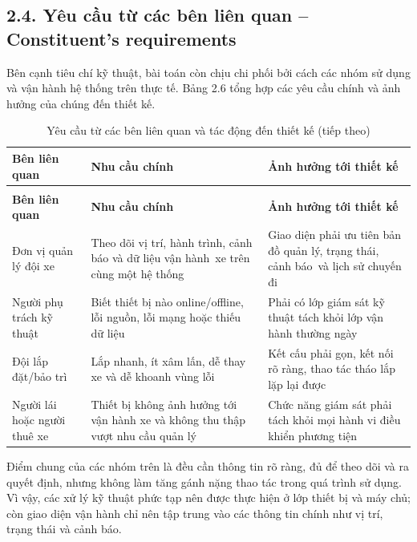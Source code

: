 \documentclass[a4paper]{extarticle}
\newcommand{\thesissettableid}[2]{%
  \renewcommand{\thetable}{#1}%
  \renewcommand{\theHtable}{#2}%
}
\begin{document}
\subsection{2.4. Yêu cầu từ các bên liên quan -- Constituent's requirements}\label{yuxeau-cux1ea7u-tux1eeb-cuxe1c-buxean-liuxean-quan-constituents-requirements}

Bên cạnh tiêu chí kỹ thuật, bài toán còn chịu chi phối bởi cách các nhóm sử dụng và vận hành hệ thống trên thực tế. Bảng 2.6 tổng hợp các yêu cầu chính và ảnh hưởng của chúng đến thiết kế.

{\thesissettableid{2.6}{condensed-r2-bang-2-6-yeu-cau-tu-cac-ben-lien-quan-va-tac-dong-den-thiet-ke}
\def\LTcaptype{table}
\begin{longtable}{|L{(\linewidth - 4\tabcolsep) * }|L{(\linewidth - 4\tabcolsep) * }|L{(\linewidth - 4\tabcolsep) * }|}
\caption{Yêu cầu từ các bên liên quan và tác động đến thiết kế}\label{tab:condensed-r2-bang-2-6-yeu-cau-tu-cac-ben-lien-quan-va-tac-dong-den-thiet-ke}\\
\hline
\textbf{Bên liên quan} & \textbf{Nhu cầu chính} & \textbf{Ảnh hưởng tới thiết kế} \\
\hline
\endfirsthead
\caption[]{Yêu cầu từ các bên liên quan và tác động đến thiết kế (tiếp theo)}\\
\hline
\textbf{Bên liên quan} & \textbf{Nhu cầu chính} & \textbf{Ảnh hưởng tới thiết kế} \\
\hline
\endhead
\endfoot
\endlastfoot
Đơn vị quản lý đội xe & Theo dõi vị trí, hành trình, cảnh báo và dữ liệu vận hành~xe trên cùng một hệ thống & Giao diện phải ưu tiên bản đồ quản lý, trạng thái, cảnh báo~và lịch sử chuyến đi \\\hline
Người phụ trách kỹ thuật & Biết thiết bị nào online/offline, lỗi nguồn, lỗi mạng hoặc thiếu dữ liệu & Phải có lớp giám sát kỹ thuật tách khỏi lớp vận hành thường ngày \\\hline
Đội lắp đặt/bảo trì & Lắp nhanh, ít xâm lấn, dễ thay xe và dễ khoanh vùng lỗi & Kết cấu phải gọn, kết nối rõ ràng, thao tác tháo lắp lặp lại được \\\hline
Người lái hoặc người thuê xe & Thiết bị không ảnh hưởng tới vận hành xe và không thu thập vượt nhu cầu quản lý & Chức năng giám sát phải tách khỏi mọi hành vi điều khiển phương tiện \\\hline
\end{longtable}
}
Điểm chung của các nhóm trên là đều cần thông tin rõ ràng, đủ để theo dõi và ra quyết định, nhưng không làm tăng gánh nặng thao tác trong quá trình sử dụng. Vì vậy, các xử lý kỹ thuật phức tạp nên được thực hiện ở lớp thiết bị và máy chủ; còn giao diện vận hành chỉ nên tập trung vào các thông tin chính như vị trí, trạng thái và cảnh báo.
\end{document}
